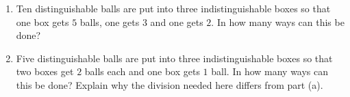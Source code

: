 \begin{enumerate}
\item[(a)] Ten distinguishable balls are put into three indistinguishable boxes so that one box gets $5$ balls, one gets $3$ and one gets $2$. In how many ways can this be done?
\item[(b)] Five distinguishable balls are put into three indistinguishable boxes so that two boxes get $2$ balls each and one box gets $1$ ball. In how many ways can this be done? Explain why the division needed here differs from part (a).
\end{enumerate}
